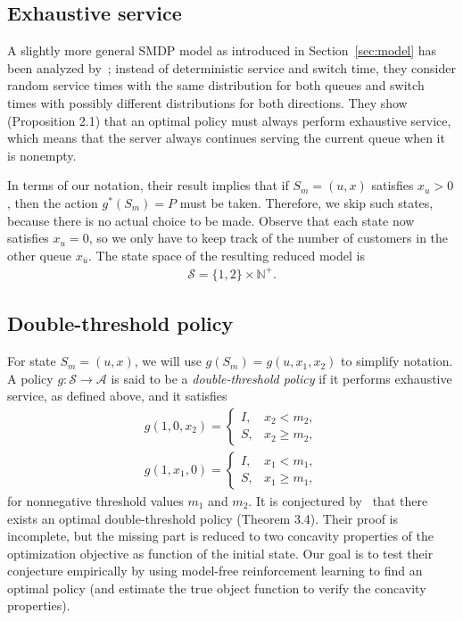 \documentclass{article}
\theoremstyle{definition}
\theoremstyle{plain}
\begin{document}
\subsection{Exhaustive service}

A slightly more general SMDP model as introduced in Section~\ref{sec:model} has
been analyzed by~\cite{hofriOptimalControlTwo1987}; instead of deterministic
service and switch time, they consider random service times with the same
distribution for both queues and switch times with possibly different
distributions for both directions. They show (Proposition 2.1) that an optimal
policy must always perform exhaustive service, which means that the server
always continues serving the current queue when it is nonempty.

In terms of our notation, their result implies that if $S_{m} = (u, x)$
satisfies $x_{u} > 0$, then the action $g^{*}(S_{m}) = P$ must be taken.
Therefore, we skip such states, because there is no actual choice to be made.
Observe that each state now satisfies $x_{u} = 0$, so we only have to keep track
of the number of customers in the other queue $x_{\bar{u}}$. The state space of
the resulting reduced model is
\begin{align}
  \mathcal{S} = \{1,2\} \times \mathbb{N}^{+} .
\end{align}

\subsection{Double-threshold policy}

For state $S_{m} = (u, x)$, we will use $g(S_{m}) = g(u, x_{1}, x_{2})$ to
simplify notation. A policy $g : \mathcal{S} \rightarrow \mathcal{A}$ is said to
be a \textit{double-threshold policy} if it performs exhaustive service, as
defined above, and it satisfies
\begin{align}
  g(1, 0, x_{2}) = \begin{cases}
                     I, & x_{2} < m_{2} , \\
                     S, & x_{2} \geq m_{2} ,
                    \end{cases}
\end{align}
\begin{align}
  g(1, x_{1}, 0) = \begin{cases}
                     I, & x_{1} < m_{1} , \\
                     S, & x_{1} \geq m_{1} ,
                    \end{cases}
\end{align}
for nonnegative threshold values $m_{1}$ and $m_{2}$. It is conjectured
by~\cite{hofriOptimalControlTwo1987} that there exists an optimal
double-threshold policy (Theorem 3.4). Their proof is incomplete, but the
missing part is reduced to two concavity properties of the optimization
objective as function of the initial state. Our goal is to test their conjecture
empirically by using model-free reinforcement learning to find an optimal policy
(and estimate the true object function to verify the concavity properties).
\end{document}
